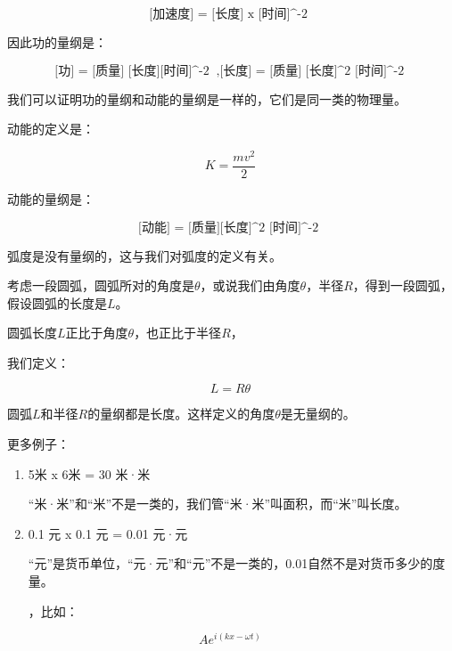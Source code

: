\begin{equation}
\text{[加速度] = [长度] x [时间]^-2 }~
\end{equation}

因此功的量纲是：

\begin{equation}
\text{[功] = [质量] [长度][时间]^-2 }~,\text{[长度] = [质量] [长度]^2 [时间]^-2}~
\end{equation}

我们可以证明功的量纲和动能的量纲是一样的，它们是同一类的物理量。

动能的定义是：

\begin{equation}
K = \frac{m v^2}{2}~
\end{equation}

动能的量纲是：

\begin{equation}
\text{[动能] = [质量][长度]^2 [时间]^-2 }~
\end{equation}

弧度是没有量纲的，这与我们对弧度的定义有关。

考虑一段圆弧，圆弧所对的角度是$\theta$，或说我们由角度$\theta$，半径$R$，得到一段圆弧，假设圆弧的长度是$L$。

圆弧长度$L$正比于角度$\theta$，也正比于半径$R$，

我们定义：

\begin{equation}
L = R \theta~
\end{equation}

圆弧$L$和半径$R$的量纲都是长度。这样定义的角度$\theta$是无量纲的。

更多例子：

\begin{enumerate}

\item 

5米 x 6米 = 30 米·米

“米·米”和“米”不是一类的，我们管“米·米”叫面积，而“米”叫长度。
\item

0.1 元 x 0.1 元 = 0.01 元·元

“元”是货币单位，“元·元”和“元”不是一类的，0.01自然不是对货币多少的度量。

，比如：
\end{enumerate}

\begin{equation}
A e^{i (kx - \omega t)}~
\end{equation}

